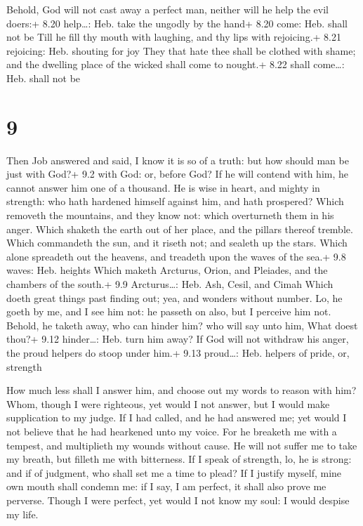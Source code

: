  Behold, God will not cast away a perfect man, neither will
he help the evil doers:+ 8.20 help\ldots: Heb. take the ungodly by the
hand+ 8.20 come: Heb. shall not be  Till he fill thy mouth
with laughing, and thy lips with rejoicing.+ 8.21 rejoicing: Heb.
shouting for joy  They that hate thee shall be clothed with
shame; and the dwelling place of the wicked shall come to nought.+ 8.22
shall come\ldots: Heb. shall not be

\hypertarget{section-8}{%
\section{9}\label{section-8}}

 Then Job answered and said,  I know it is so of
a truth: but how should man be just with God?+ 9.2 with God: or, before
God?  If he will contend with him, he cannot answer him one
of a thousand.  He is wise in heart, and mighty in strength:
who hath hardened himself against him, and hath prospered? 
Which removeth the mountains, and they know not: which overturneth them
in his anger.  Which shaketh the earth out of her place, and
the pillars thereof tremble.  Which commandeth the sun, and
it riseth not; and sealeth up the stars.  Which alone
spreadeth out the heavens, and treadeth upon the waves of the sea.+ 9.8
waves: Heb. heights  Which maketh Arcturus, Orion, and
Pleiades, and the chambers of the south.+ 9.9 Arcturus\ldots: Heb. Ash,
Cesil, and Cimah  Which doeth great things past finding
out; yea, and wonders without number.  Lo, he goeth by me,
and I see him not: he passeth on also, but I perceive him not.
 Behold, he taketh away, who can hinder him? who will say
unto him, What doest thou?+ 9.12 hinder\ldots: Heb. turn him away?
 If God will not withdraw his anger, the proud helpers do
stoop under him.+ 9.13 proud\ldots: Heb. helpers of pride, or, strength

 How much less shall I answer him, and choose out my words
to reason with him?  Whom, though I were righteous, yet
would I not answer, but I would make supplication to my judge.
 If I had called, and he had answered me; yet would I not
believe that he had hearkened unto my voice.  For he
breaketh me with a tempest, and multiplieth my wounds without cause.
 He will not suffer me to take my breath, but filleth me
with bitterness.  If I speak of strength, lo, he is strong:
and if of judgment, who shall set me a time to plead?  If I
justify myself, mine own mouth shall condemn me: if I say, I am perfect,
it shall also prove me perverse.  Though I were perfect,
yet would I not know my soul: I would despise my life.

